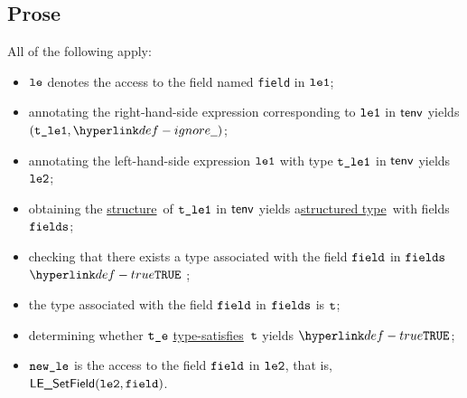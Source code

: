 \documentclass{book}
\newcommand\ProseOrTypeError[0]{\ProseTerminateAs{\TypeErrorConfig}}
\newcommand\structuredtype[0]{\hyperlink{def-structuredtype}{structured type}}
\newcommand\structure[0]{\hyperlink{def-structure}{structure}}
\newcommand\typesatisfies[0]{\hyperlink{def-typesatisfies}{type-satisfies}}
\newcommand\TypeErrorCode[1]{\texttt{TE\_#1}}
\newcommand\MissingField[0]{\hyperlink{def-mf}{\TypeErrorCode{MF}}}
\begin{document}
\subsection{Prose}
All of the following apply:
\begin{itemize}
  \item $\texttt{le}$ denotes the access to the field named \texttt{field} in $\texttt{le1}$;
  \item annotating the right-hand-side expression corresponding to $\texttt{le1}$ in $\textsf{tenv}$ yields \\ $(\vtleone, \Ignore)$\ProseOrTypeError;
  \item annotating the left-hand-side expression  $\texttt{le1}$ with type $\texttt{t\_le1}$ in $\textsf{tenv}$ yields $\texttt{le2}$\ProseOrTypeError;
  \item obtaining the \structure\ of $\texttt{t\_le1}$ in $\textsf{tenv}$ yields a\structuredtype\ with fields \\
        $\texttt{fields}$\ProseOrTypeError;
  \item checking that there exists a type associated with the field $\texttt{field}$ in $\texttt{fields}$ $\True$ \ProseTerminateAs{\MissingField};
  \item the type associated with the field $\texttt{field}$ in $\texttt{fields}$ is $\texttt{t}$;
  \item determining whether $\texttt{t\_e}$ \typesatisfies\ $\texttt{t}$ yields $\True$\ProseOrTypeError;
  \item $\texttt{new\_le}$ is the access to the field $\texttt{field}$ in $\texttt{le2}$, that is, $\textsf{LE\_SetField}(\texttt{le2}, \texttt{field})$.
\end{itemize}


\end{document}
